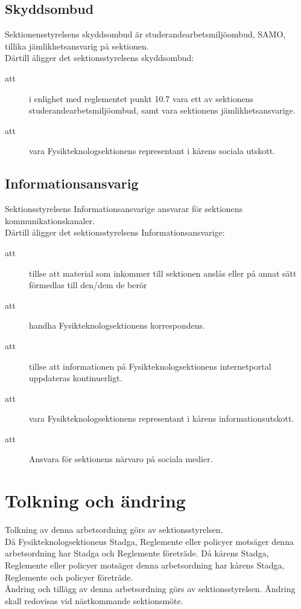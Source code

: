 \subsection{Skyddsombud}
Sektionensstyrelsens skyddsombud är studerandearbetsmiljöombud, SAMO, tillika jämlikhetsansvarig på sektionen.\\
Därtill åligger det sektionsstyrelsens skyddsombud:
\begin{description}

\item[att] i enlighet med reglementet punkt 10.7 vara ett av sektionens studerandearbetsmiljöombud, samt vara sektionens jämlikhetsansvarige.
\item[att] vara Fysikteknologsektionens representant i kårens sociala utskott. 
\end{description}

\subsection{Informationsansvarig}
Sektionsstyrelsens Informationsansvarige ansvarar för sektionens kommunikationskanaler.\\ Därtill åligger det sektionsstyrelsens Informationsansvarige:
\begin{description}

\item[att] tillse att material som inkommer till sektionen anslås eller på annat sätt förmedlas till den/dem de berör
\item[att] handha Fysikteknologsektionens korrespondens.
\item[att] tillse att informationen på Fysikteknologsektionens internetportal
uppdateras kontinuerligt.
\item[att] vara Fysikteknologsektionens representant i kårens informationsutskott.
\item[att] Ansvara för sektionens närvaro på sociala medier.
\end{description}

\section{Tolkning och ändring}
Tolkning av denna arbetsordning görs av sektionsstyrelsen.\\ Då Fysikteknologsektionens Stadga, Reglemente eller policyer motsäger denna arbetsordning har Stadga och Reglemente företräde. Då kårens Stadga, Reglemente eller policyer motsäger denna arbetsordning har kårens Stadga, Reglemente och policyer företräde.\\
Ändring och tillägg av denna arbetsordning görs av sektionsstyrelsen. Ändring skall redovisas vid nästkommande sektionsmöte. 
\newpage